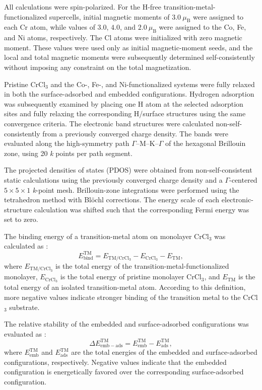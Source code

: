 \documentclass[journal=jacsat,manuscript=article]{achemso}
\begin{document}
All calculations were spin-polarized. For the H-free transition-metal-functionalized supercells, initial magnetic moments of $3.0~\mu_{\mathrm{B}}$ were assigned to each Cr atom, while values of $3.0$, $4.0$, and $2.0~\mu_{\mathrm{B}}$ were assigned to the Co, Fe, and Ni atoms, respectively. The Cl atoms were initialized with zero magnetic moment. These values were used only as initial magnetic-moment seeds, and the local and total magnetic moments were subsequently determined self-consistently without imposing any constraint on the total magnetization.

Pristine CrCl$_3$ and the Co-, Fe-, and Ni-functionalized systems were fully relaxed in both the surface-adsorbed and embedded configurations. Hydrogen adsorption was subsequently examined by placing one H atom at the selected adsorption sites and fully relaxing the corresponding H/surface structures using the same convergence criteria. The electronic band structures were calculated non-self-consistently from a previously converged charge density. The bands were evaluated along the high-symmetry path $\Gamma$--M--K--$\Gamma$ of the hexagonal Brillouin zone, using 20 \textit{k} points per path segment.

The projected densities of states (PDOS) were obtained from non-self-consistent static calculations using the previously converged charge density and a $\Gamma$-centered $5 \times 5 \times 1$ \textit{k}-point mesh. Brillouin-zone integrations were performed using the tetrahedron method with Blöchl corrections. The energy scale of each electronic-structure calculation was shifted such that the corresponding Fermi energy was set to zero.

The binding energy of a transition-metal atom on monolayer CrCl$_3$ was calculated as \cite{Liao2022,Sholl2009DensityTheory,Martin2004ElectronicMethods}:
\begin{equation}
  E_{\mathrm{bind}}^{\mathrm{TM}}
  =
  E_{\mathrm{TM/CrCl_3}}
  -
  E_{\mathrm{CrCl_3}}
  -
  E_{\mathrm{TM}},
  \label{eq:TM_binding}
\end{equation}
where $E_{\mathrm{TM/CrCl_3}}$ is the total energy of the transition-metal-functionalized monolayer, $E_{\mathrm{CrCl_3}}$ is the total energy of pristine monolayer CrCl$_3$, and $E_{\mathrm{TM}}$ is the total energy of an isolated transition-metal atom. According to this definition, more negative values indicate stronger binding of the transition metal to the CrCl$_3$ substrate.

The relative stability of the embedded and surface-adsorbed configurations was evaluated as \cite{Liao2022,Sholl2009DensityTheory,Martin2004ElectronicMethods}:
\begin{equation}
  \Delta E_{\mathrm{emb-ads}}^{\mathrm{TM}}
  =
  E_{\mathrm{emb}}^{\mathrm{TM}}
  -
  E_{\mathrm{ads}}^{\mathrm{TM}},
  \label{eq:relative_stability}
\end{equation}
where $E_{\mathrm{emb}}^{\mathrm{TM}}$ and $E_{\mathrm{ads}}^{\mathrm{TM}}$ are the total energies of the embedded and surface-adsorbed configurations, respectively. Negative values indicate that the embedded configuration is energetically favored over the corresponding surface-adsorbed configuration.
\end{document}
